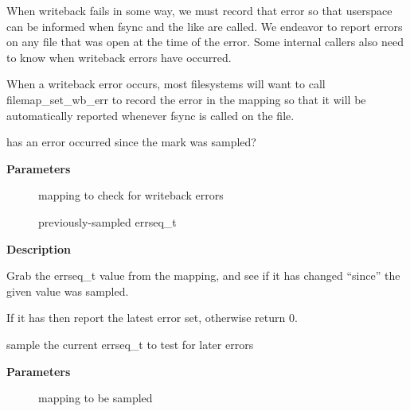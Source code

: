 \documentclass[a4paper,8pt,english]{sphinxmanual}
\begin{document}
When writeback fails in some way, we must record that error so that
userspace can be informed when fsync and the like are called.  We endeavor
to report errors on any file that was open at the time of the error.  Some
internal callers also need to know when writeback errors have occurred.

When a writeback error occurs, most filesystems will want to call
filemap\_set\_wb\_err to record the error in the mapping so that it will be
automatically reported whenever fsync is called on the file.

\begin{fulllineitems}
\label{filesystems/index:c.filemap_check_wb_err}
has an error occurred since the mark was sampled?

\end{fulllineitems}


\textbf{Parameters}
\begin{description}
\item[{}] \leavevmode
mapping to check for writeback errors

\item[{}] \leavevmode
previously-sampled errseq\_t

\end{description}

\textbf{Description}

Grab the errseq\_t value from the mapping, and see if it has changed ``since''
the given value was sampled.

If it has then report the latest error set, otherwise return 0.

\begin{fulllineitems}
\label{filesystems/index:c.filemap_sample_wb_err}
sample the current errseq\_t to test for later errors

\end{fulllineitems}


\textbf{Parameters}
\begin{description}
\item[{}] \leavevmode
mapping to be sampled

\end{description}
\end{document}
